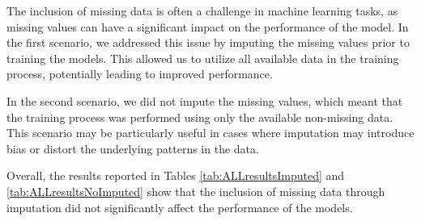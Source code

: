 The inclusion of missing data is often a challenge in machine learning tasks, as missing values can have a significant impact on the performance of the model.
In the first scenario, we addressed this issue by imputing the missing values prior to training the models. 
This allowed us to utilize all available data in the training process, potentially leading to improved performance.

In the second scenario, we did not impute the missing values, which meant that the training process was performed using only the available non-missing data.
This scenario may be particularly useful in cases where imputation may introduce bias or distort the underlying patterns in the data.

Overall, the results reported in Tables \ref{tab:ALLresultsImputed} and \ref{tab:ALLresultsNoImputed} show that the inclusion of missing data through imputation did not significantly affect the performance of the models.